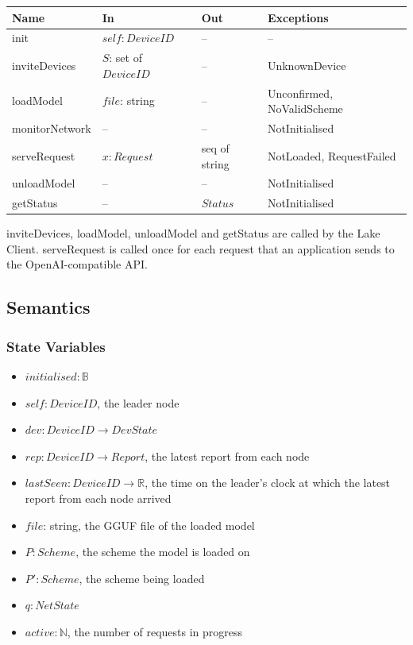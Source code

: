 \documentclass[12pt, titlepage]{article}
\begin{document}
\begin{center}
\begin{tabular}{p{3.3cm} p{3.6cm} p{2.9cm} p{3.6cm}}
\toprule
\textbf{Name} & \textbf{In} & \textbf{Out} & \textbf{Exceptions} \\
\midrule
init & $\mathit{self}: \mathit{DeviceID}$ & -- & -- \\
inviteDevices & $S$: set of $\mathit{DeviceID}$ & -- & UnknownDevice \\
loadModel & $\mathit{file}$: string & -- & Unconfirmed, NoValidScheme \\
monitorNetwork & -- & -- & NotInitialised \\
serveRequest & $x: \mathit{Request}$ & seq of string & NotLoaded, RequestFailed \\
unloadModel & -- & -- & NotInitialised \\
getStatus & -- & $\mathit{Status}$ & NotInitialised \\
\bottomrule
\end{tabular}
\end{center}

{\raggedright \noindent inviteDevices, loadModel, unloadModel and getStatus
are called by the Lake Client. serveRequest is called once for each request
that an application sends to the OpenAI-compatible API.\par}

\subsection{Semantics}

\subsubsection{State Variables}

\begin{itemize}
  \item $\mathit{initialised}: \mathbb{B}$
  \item $\mathit{self}: \mathit{DeviceID}$, the leader node
  \item $\mathit{dev}: \mathit{DeviceID} \to \mathit{DevState}$
  \item $\mathit{rep}: \mathit{DeviceID} \to \mathit{Report}$, the latest
    report from each node
  \item $\mathit{lastSeen}: \mathit{DeviceID} \to \mathbb{R}$, the time on the
    leader's clock at which the latest report from each node arrived
  \item $\mathit{file}$: string, the GGUF file of the loaded model
  \item $P: \mathit{Scheme}$, the scheme the model is loaded on
  \item $P': \mathit{Scheme}$, the scheme being loaded
  \item $q: \mathit{NetState}$
  \item $\mathit{active}: \mathbb{N}$, the number of requests in progress
\end{itemize}
\end{document}
